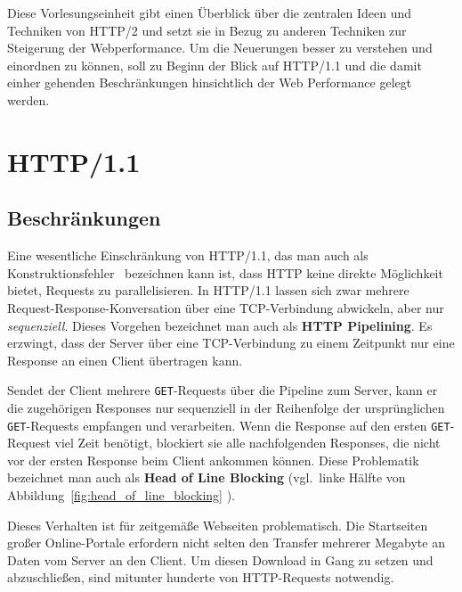 \documentclass[a4paper, justified, notoc]{tufte-handout} %
\begin{document}
Diese Vorlesungseinheit gibt einen Überblick über die zentralen Ideen und Techniken von HTTP/2 und setzt sie in Bezug zu anderen Techniken zur Steigerung der Webperformance. Um die Neuerungen besser zu verstehen und einordnen zu können, soll zu Beginn der Blick auf HTTP/1.1 und die damit einher gehenden Beschränkungen hinsichtlich der Web Performance gelegt werden. 



\section{HTTP/1.1} %
\label{sec:beschraenkungen}
\subsection{Beschränkungen} %
\label{sub:head_of_line_blocking}

Eine wesentliche Einschränkung von HTTP/1.1, das man auch als Konstruktionsfehler~\citep{heise:2018} bezeichnen kann ist, dass HTTP keine direkte Möglichkeit bietet, Requests zu parallelisieren. 
In HTTP/1.1 lassen sich zwar mehrere Request-Response-Konversation über eine TCP-Verbindung abwickeln, aber nur \emph{sequenziell}. Dieses Vorgehen bezeichnet man auch als \textbf{HTTP Pipelining}. Es erzwingt, dass der Server über eine TCP-Verbindung zu einem Zeitpunkt nur eine Response an einen Client übertragen kann.

Sendet der Client mehrere \texttt{GET}-Requests über die Pipeline zum Server, kann er die zugehörigen Responses nur sequenziell in der Reihenfolge der ursprünglichen \texttt{GET}-Requests empfangen und verarbeiten. Wenn die Response auf den ersten \texttt{GET}-Request viel Zeit benötigt, blockiert sie alle nachfolgenden Responses, die nicht vor der ersten Response beim Client ankommen können. Diese Problematik bezeichnet man auch als \textbf{Head of Line Blocking} (vgl.\ linke Hälfte von Abbildung~\ref{fig:head_of_line_blocking} ).


Dieses Verhalten ist für zeitgemäße Webseiten problematisch. Die Startseiten großer Online-Portale erfordern nicht selten den Transfer mehrerer Megabyte an Daten vom Server an den Client. Um diesen Download in Gang zu setzen und abzuschließen, sind mitunter hunderte von HTTP-Requests notwendig.
\end{document}

